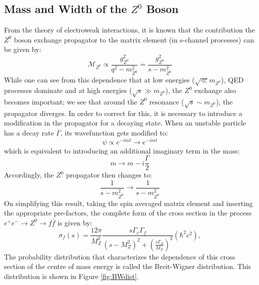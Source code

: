 \subsection{Mass and Width of the $Z^{0}$ Boson}
From the theory of electroweak interactions, it is known that the contribution the $Z^{0}$ boson exchange propagator to the matrix element (in s-channel processes) can be given by:
\begin{equation}
\mathcal{M}_{Z^{0}}\propto \dfrac{g_{Z^{0}}^{2}}{q^{2}-m_{Z^{0}}^{2}}=\dfrac{g_{Z^{0}}^{2}}{s-m_{Z^{0}}^{2}}
\end{equation}
While one can see from this dependence that at low energies ($\sqrt \ll m_{Z^{0}}$), QED processes dominate and at high energies ($\sqrt{s}\gg m_{Z^{0}}$), the $Z^{0}$ exchange also becomes important; we see that around the $Z^{0}$ resonance ($\sqrt{s}\sim  m_{Z^{0}}$), the propagator diverges. In order to correct for this, it is necessary to introduce a modification in the propagator for a decaying state. When an unstable particle has a decay rate $\Gamma$, its wavefunction gets modified to:
\begin{equation}
\psi\propto e^{-imt}\rightarrow e^{-imt}
\end{equation} 
which is equivalent to introducing an additional imaginary term in the mass:
\begin{equation}
m\rightarrow m-i\dfrac{\Gamma}{2}
\end{equation}
Accordingly, the $Z^{0}$ propagator then changes to:
\begin{equation}
\dfrac{1}{s-m_{Z^{0}}^{2}}\rightarrow \dfrac{1}{s-m_{Z^{0}}^{2}} 
\end{equation}
On simplifying this result, taking the spin averaged matrix element and inserting the appropriate pre-factors, the complete form of the cross section in the process $e^{+}e^{-}\rightarrow Z^{0}\rightarrow f\bar{f}$ is given by:
\begin{equation}
    \sigma_f (s) = \frac{12\pi}{M_Z^2} \frac{s \Gamma_e \Gamma_f}{(s-M_Z^2)^2 + \left(\frac{s\Gamma_Z}{M_Z}\right)^2} (\hbar^2 c^2),
\end{equation} 
The probability distribution that characterizes the dependence of this cross section of the centre of mass energy is called the Breit-Wigner distribution. This distribution is shown in Figure \ref{fig:BWdist}.

